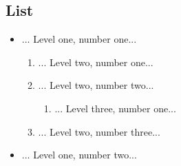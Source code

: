 \documentclass{article}
\begin{document}
\subsection{List}
\begin{itemize}
\item  ... Level one, number one...

\begin{enumerate}
\item  ... Level two, number one...
\item  ... Level two, number two...

\begin{enumerate}
\item  ... Level three, number one...
\end{enumerate}
\item  ... Level two, number three...
\end{enumerate}
\item  ... Level one, number two...
\end{itemize}
\end{document}
